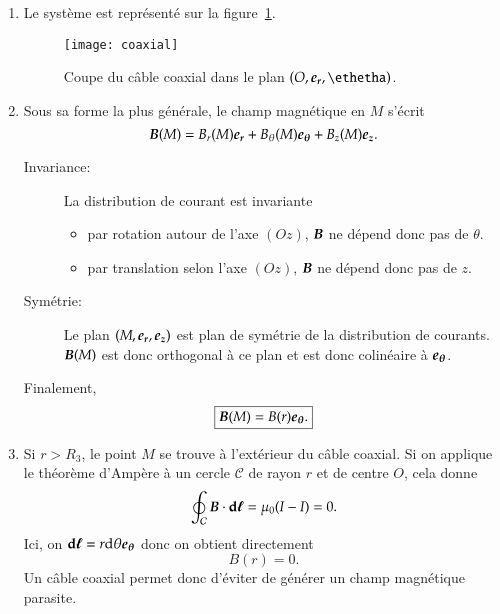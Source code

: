 \begin{corrige}
\begin{enumerate}
	\item Le système est représenté sur la figure~\ref{fig:magneto_coaxial}.
		\begin{figure}[h]
		\centering
		\texttt{[image: coaxial]}
		\caption{Coupe du câble coaxial dans le plan $(O, \er, \ethetha)$.}
		\label{fig:magneto_coaxial}
	\end{figure}
	\item Sous sa forme la plus générale, le champ magnétique en $M$ 
	      s'écrit 
		      \begin{equation*}
			      \vecb(M) = B_r(M) \er + B_\theta(M) \etheta +
			      B_z(M) \ez.
		      \end{equation*}

		      \begin{description}
			     \item[Invariance:] La distribution de courant est 
			     invariante
			     \begin{itemize}
			     	\item par rotation autour de l'axe $(Oz)$, 
			     	      $\vecb$ ne dépend donc pas de $\theta$.
				\item par translation selon l'axe $(Oz)$, $\vecb$
				      ne dépend donc pas de $z$.
			     \end{itemize}
			      \item[Symétrie: ]
			      Le plan $(M, \er, \ez)$ est plan 
			      de symétrie de la distribution de 
			      courants. $\vecb(M)$ est donc 
			      orthogonal à ce plan et est donc colinéaire à
			      $\etheta$.
		      \end{description}
		     Finalement,
		     \begin{equation*}
			     \boxed{\vecb(M) = B(r) \etheta.}
		     \end{equation*}
	
	  \item Si $r > R_3$, le point $M$ se trouve à l'extérieur du câble 
		coaxial. Si on applique le théorème d'Ampère à un cercle 
		$\mathcal{C}$ de rayon $r$ et de centre $O$, cela donne
		\begin{equation*}
			\oint_\mathcal{C} \vecb \cdot \dl = \mu_0(I - I) = 0.
		\end{equation*}
		Ici, on $\dl = r \dtheta \etheta$ donc on obtient directement 
		\begin{equation*}
			\boxed{B(r) = 0}.
		\end{equation*}
		 Un câble 
		coaxial permet donc d'éviter de générer un champ magnétique parasite.


\end{enumerate}
\end{corrige}
